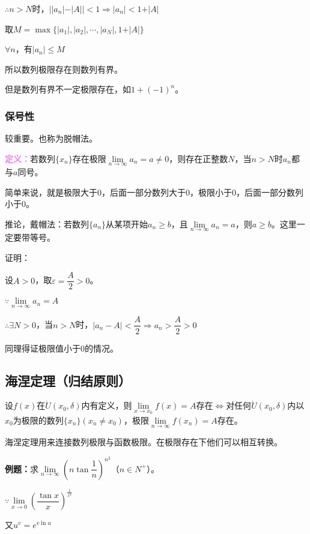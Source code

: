 \documentclass[UTF8, 12pt]{ctexart}
\begin{document}
$\therefore n>N$时，$\vert\vert a_n\vert-\vert A\vert\vert<1\Rightarrow\vert a_n\vert<1+\vert A\vert$

取$M=\max\{\vert a_1\vert,\vert a_2\vert,\cdots,\vert a_N\vert,1+\vert A\vert\}$

$\forall n$，有$\vert a_n\vert\leqslant M$

所以数列极限存在则数列有界。

但是数列有界不一定极限存在，如$1+(-1)^n$。

\subsubsection{保号性}

较重要。也称为脱帽法。

\textcolor{violet}{\textbf{定义：}}若数列$\{x_n\}$存在极限$\lim\limits_{n\to\infty}a_n=a\neq 0$，则存在正整数$N$，当$n>N$时$a_n$都与$a$同号。

简单来说，就是极限大于0，后面一部分数列大于0，极限小于0，后面一部分数列小于0。

推论，戴帽法：若数列$\{a_n\}$从某项开始$a_n\geqslant b$，且$\lim\limits_{n\to\infty}a_n=a$，则$a\geqslant b$。这里一定要带等号。

证明：

设$A>0$，取$\varepsilon=\dfrac{A}{2}>0$。

$\because\lim\limits_{n\to\infty}a_n=A$

$\therefore\exists N>0$，当$n>N$时，$\vert a_n-A\vert<\dfrac{A}{2}\Rightarrow a_n>\dfrac{A}{2}>0$

同理得证极限值小于0的情况。

\subsection{海涅定理（归结原则）}

设$f(x)$在$\mathring{U}(x_0,\delta)$内有定义，则$\lim\limits_{x\to x_0}f(x)=A$存在$\Leftrightarrow$对任何$\mathring{U}(x_0,\delta)$内以$x_0$为极限的数列$\{x_n\}(x_n\neq x_0)$，极限$\lim\limits_{n\to\infty}f(x_n)=A$存在。

海涅定理用来连接数列极限与函数极限。在极限存在下他们可以相互转换。

\textbf{例题：}求$\lim\limits_{n\to\infty}\left(n\tan\dfrac{1}{n}\right)^{n^2}$（$n\in N^+$）。

$\because \lim\limits_{x\to 0}\left(\dfrac{\tan x}{x}\right)^{\frac{1}{x^2}}$

又$u^v=e^{v\ln u}$
\end{document}
